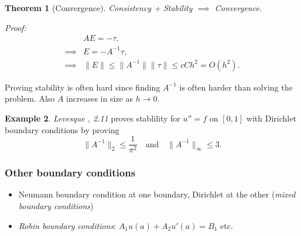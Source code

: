\documentclass[12pt, a4paper]{article}
\newtheorem{thm}{Theorem}[section]
\theoremstyle{definition}
\newtheorem{example}[thm]{Example}
\theoremstyle{remark}
\numberwithin{equation}{section}
\begin{document}
\begin{thm}[Convergence]
Consistency + Stability $\implies$ Convergence.

Proof: 
\begin{align*}
&A E= -\tau,\\
\implies & E = -A^{-1}\tau,\\
\implies &\| E\| \le \|A^{-1}\|\|\tau\| \le c C h^{2} = O(h^{2}).
\end{align*}
\end{thm}

Proving stability is often hard  since finding $A^{-1}$ is often harder than solving the problem. Also $A$ increases in size as $h \to 0$. 
\begin{example}
 \emph{Levesque , 2.11} proves stablility for $u''=f$ on $[0,1]$ with Dirichlet boundary conditions by proving
\[\|A^{-1}\|_{2} \le \frac{1}{\pi^2}  \quad \text{and} \quad \|A^{-1}\|_{\infty} \le 3. \]
\end{example}

\newpage
\subsubsection{Other boundary conditions}
\begin{itemize}
\item Neumann boundary condition at one boundary, Dirichlet at the other (\emph{mixed boundary conditions})
\item \emph{Robin boundary conditions}: $A_1 u(a) + A_2 u'(a) = B_1$ etc.
\end{itemize}
\end{document}
